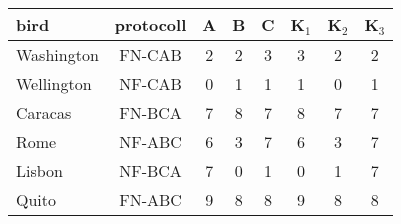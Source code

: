 \begin{tabular}{l|c|ccc||ccc}
bird & protocoll & A & B & C & K$_1$  & K$_2$ & K$_3$ \\\midrule
Washington & FN-CAB & 2 & 2 & 3 & 3 & 2 & 2 \\
Wellington & NF-CAB & 0 & 1 & 1 & 1 & 0 & 1 \\
Caracas & FN-BCA & 7 & 8 & 7 & 8 & 7 & 7 \\
Rome & NF-ABC & 6 & 3 & 7 & 6 & 3 & 7 \\
Lisbon & NF-BCA & 7 & 0 & 1 & 0 & 1 & 7 \\
Quito & FN-ABC & 9 & 8 & 8 & 9 & 8 & 8 \\
\end{tabular}